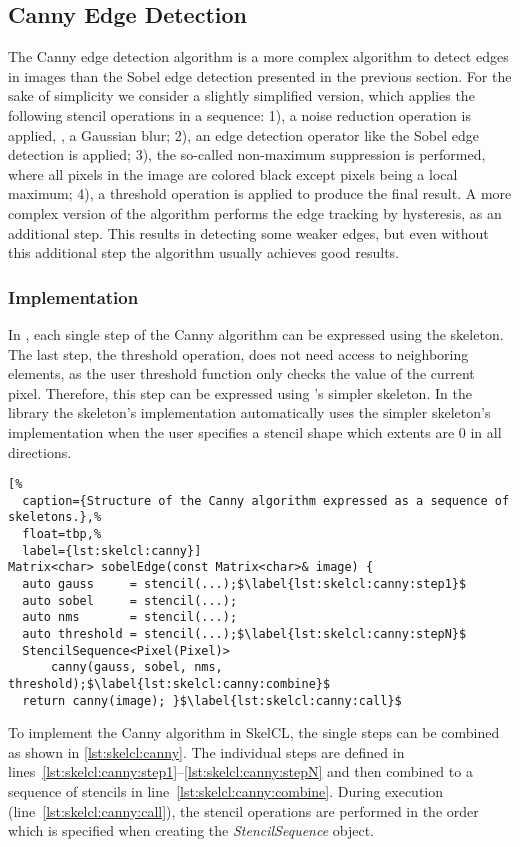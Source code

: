 \subsection{Canny Edge Detection}
The Canny edge detection algorithm is a more complex algorithm to detect edges in images than the Sobel edge detection presented in the previous section.
For the sake of simplicity we consider a slightly simplified version, which applies the following stencil operations in a sequence:
1), a noise reduction operation is applied, \eg, a Gaussian blur;
2), an edge detection operator like the Sobel edge detection is applied;
3), the so-called non-maximum suppression is performed, where all pixels in the image are colored black except pixels being a local maximum;
4), a threshold operation is applied to produce the final result.
A more complex version of the algorithm performs the edge tracking by hysteresis, as an additional step.
This results in detecting some weaker edges, but even without this additional step the algorithm usually achieves good results.


\subsubsection*{\SkelCL Implementation}
In \SkelCL, each single step of the Canny algorithm can be expressed using the \stencil skeleton.
The last step, the threshold operation, does not need access to neighboring elements, as the user threshold function only checks the value of the current pixel.
Therefore, this step can be expressed using \SkelCL's simpler \map skeleton.
In the \SkelCL library the  skeleton's implementation automatically uses the simpler \map skeleton's implementation when the user specifies a stencil shape which extents are $0$ in all directions.

\begin{lstlisting}[%
  caption={Structure of the Canny algorithm expressed as a sequence of skeletons.},%
  float=tbp,%
  label={lst:skelcl:canny}]
Matrix<char> sobelEdge(const Matrix<char>& image) {
  auto gauss     = stencil(...);$\label{lst:skelcl:canny:step1}$
  auto sobel     = stencil(...);
  auto nms       = stencil(...);
  auto threshold = stencil(...);$\label{lst:skelcl:canny:stepN}$
  StencilSequence<Pixel(Pixel)>
      canny(gauss, sobel, nms, threshold);$\label{lst:skelcl:canny:combine}$
  return canny(image); }$\label{lst:skelcl:canny:call}$
\end{lstlisting}

To implement the Canny algorithm in SkelCL, the single steps can be combined as shown in \autoref{lst:skelcl:canny}.
The individual steps are defined in lines~\ref{lst:skelcl:canny:step1}--\ref{lst:skelcl:canny:stepN} and then combined to a sequence of stencils in line~\ref{lst:skelcl:canny:combine}.
During execution (line~\ref{lst:skelcl:canny:call}), the stencil operations are performed in the order which is specified when creating the \emph{StencilSequence} object.

